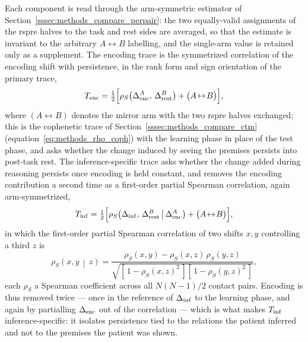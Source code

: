 Each component is read through the arm-symmetric estimator of Section~\ref{sssec:methods_compare_perpair}: the two equally-valid assignments of the \acrshort{rspre} halves to the task and rest sides are averaged, so that the estimate is invariant to the arbitrary \(A\!\leftrightarrow\!B\) labelling, and the single-arm value is retained only as a supplement. The encoding trace is the symmetrized correlation of the encoding shift with persistence, in the rank form and sign orientation of the primary trace,
\begin{equation}
    T_{\rm enc} = \tfrac{1}{2}\Big[\rho_{S}\!\left(\Delta_{\rm enc}^{A},\, \Delta_{\rm rest}^{B}\right) + \big(A\!\leftrightarrow\!B\big)\Big],
    \label{eq:methods_arc_Tenc}
\end{equation}
where \((A\!\leftrightarrow\!B)\) denotes the mirror arm with the two \acrshort{rspre} halves exchanged; this is the cophenetic trace of Section~\ref{sssec:methods_compare_ctm} (equation~\eqref{eq:methods_rho_coph}) with the learning phase in place of the test phase, and asks whether the change induced by seeing the premises persists into post-task rest. The inference-specific trace asks whether the change added during reasoning persists once encoding is held constant, and removes the encoding contribution a second time as a first-order partial Spearman correlation, again arm-symmetrized,
\begin{equation}
    T_{\rm inf} = \tfrac{1}{2}\Big[\rho_{S}\!\left(\Delta_{\rm inf},\, \Delta_{\rm rest}^{B} \,\middle|\, \Delta_{\rm enc}^{A}\right) + \big(A\!\leftrightarrow\!B\big)\Big],
    \label{eq:methods_arc_Tinf}
\end{equation}
in which the first-order partial Spearman correlation of two shifts \(x,y\) controlling a third \(z\) is
\begin{equation}
    \rho_{S}\!\left(x, y \,\middle|\, z\right) = \frac{\rho_{S}(x, y) - \rho_{S}(x, z)\,\rho_{S}(y, z)}{\sqrt{\left[\,1 - \rho_{S}(x, z)^{2}\,\right]\left[\,1 - \rho_{S}(y, z)^{2}\,\right]}},
    \label{eq:methods_arc_partial}
\end{equation}
each \(\rho_{S}\) a Spearman coefficient across all \(N(N-1)/2\) contact pairs. Encoding is thus removed twice --- once in the reference of \(\Delta_{\rm inf}\) to the learning phase, and again by partialling \(\Delta_{\rm enc}\) out of the correlation --- which is what makes \(T_{\rm inf}\) inference-specific: it isolates persistence tied to the relations the patient inferred and not to the premises the patient was shown.

